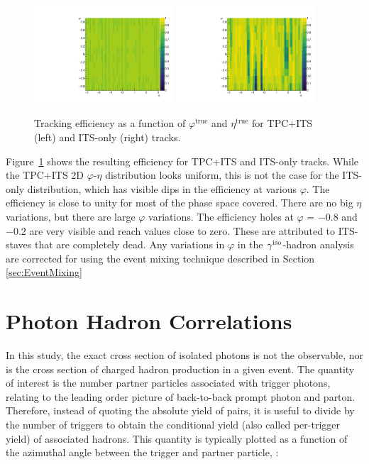 \begin{figure}[h]
\center
\includegraphics[width=0.46\textwidth]{Data_Analysis/Tracking/etaPhi_eff_tpc.pdf}
\includegraphics[width=0.46\textwidth]{Data_Analysis/Tracking/etaPhi_eff_4layers.pdf}
\caption{Tracking efficiency as a function of $\varphi^{\mathrm{true}}$ and $\eta^{\mathrm{true}}$ for TPC+ITS (left) and ITS-only (right) tracks.}
\label{fig:2Defficiency}
\end{figure}

Figure~\ref{fig:2Defficiency} shows the resulting efficiency for TPC+ITS and ITS-only tracks. While the TPC+ITS 2D $\varphi$-$\eta$ distribution looks uniform, this is not the case for the ITS-only distribution, which has visible dips in the efficiency at various $\varphi$. The efficiency is close to unity for most of the phase space covered. There are no big $\eta$ variations, but there are large $\varphi$ variations. The efficiency holes at $\varphi$ = $-$0.8 and $-$0.2 are very visible and reach values close to zero. These are attributed to ITS-staves that are completely dead. Any variations in $\varphi$ in the $\gamma^\mathrm{iso}$-hadron analysis are corrected for using the event mixing technique described in Section \ref{sec:EventMixing}
\FloatBarrier



\section{Photon Hadron Correlations}

In this study, the exact cross section of isolated photons is not the observable, nor is the cross section of charged hadron production in a given event. The quantity of interest is the number partner particles associated with trigger photons, relating to the leading order picture of back-to-back prompt photon and parton. Therefore, instead of quoting the absolute yield of pairs, it is useful to divide by the number of triggers to obtain the conditional yield (also called per-trigger yield) of associated hadrons. This quantity is typically plotted as a function of the azimuthal angle between the trigger and partner particle, \deltaphi:

